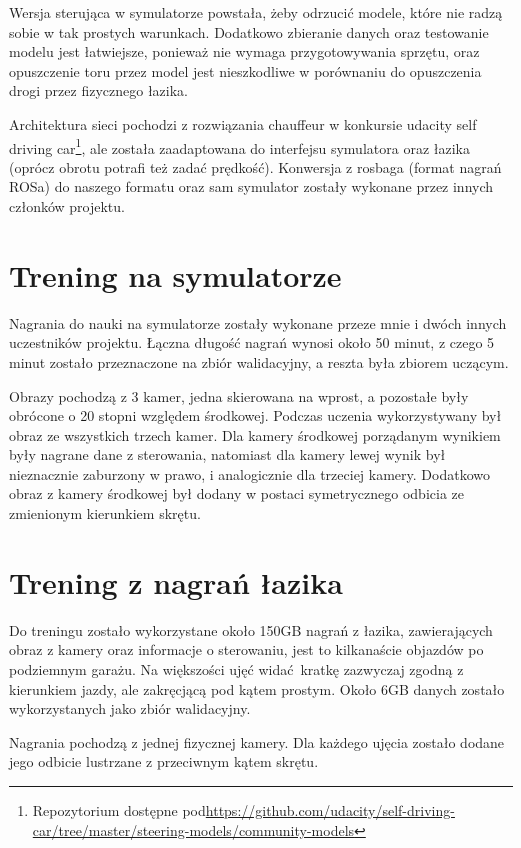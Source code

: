 Wersja sterująca w symulatorze powstała, żeby odrzucić modele, które nie radzą
sobie w tak prostych warunkach. Dodatkowo zbieranie danych oraz testowanie
modelu jest łatwiejsze, ponieważ nie wymaga przygotowywania sprzętu, oraz
opuszczenie toru przez model jest nieszkodliwe w porównaniu do opuszczenia
drogi przez fizycznego łazika.

Architektura sieci pochodzi z rozwiązania chauffeur w konkursie udacity self driving car\footnote
{ Repozytorium dostępne pod\href{https://github.com/udacity/self-driving-car/tree/master/steering-models/community-models}
{https://github.com/udacity/self-driving-car/tree/master/steering-models/community-models}},
ale została zaadaptowana do interfejsu symulatora oraz łazika (oprócz obrotu
potrafi też zadać prędkość). Konwersja z rosbaga (format nagrań ROSa) do 
naszego formatu oraz sam symulator zostały wykonane przez innych członków projektu.


\section{Trening na symulatorze}
Nagrania do nauki na symulatorze zostały wykonane przeze mnie i dwóch innych
uczestników projektu. Łączna długość nagrań wynosi około 50 minut, z czego 5
minut zostało przeznaczone na zbiór walidacyjny, a reszta była zbiorem uczącym.

Obrazy pochodzą z 3 kamer, jedna skierowana na wprost, a pozostałe były obrócone
o 20 stopni względem środkowej. Podczas uczenia wykorzystywany był obraz ze wszystkich
trzech kamer. Dla kamery środkowej porządanym wynikiem były nagrane dane z sterowania,
natomiast dla kamery lewej wynik był nieznacznie zaburzony w prawo, i analogicznie 
dla trzeciej kamery.
Dodatkowo obraz z kamery środkowej był dodany w postaci symetrycznego odbicia
ze zmienionym kierunkiem skrętu.

\section{Trening z nagrań łazika}
Do treningu zostało wykorzystane około 150GB nagrań z łazika, zawierających
obraz z kamery oraz informacje o sterowaniu, jest to kilkanaście objazdów
po podziemnym garażu. Na większości ujęć widać kratkę zazwyczaj zgodną z kierunkiem
jazdy, ale zakręcjącą pod kątem prostym. Około 6GB danych zostało wykorzystanych jako
zbiór walidacyjny.

Nagrania pochodzą z jednej fizycznej kamery. Dla każdego ujęcia zostało
dodane jego odbicie lustrzane z przeciwnym kątem skrętu.

